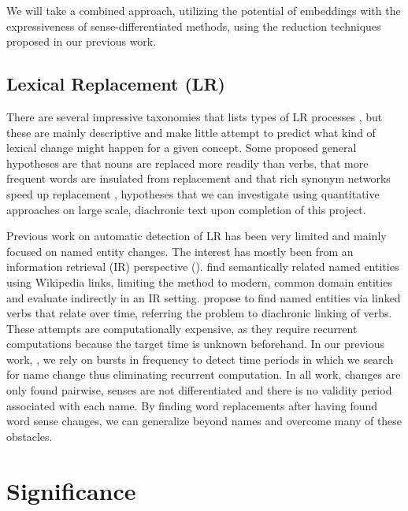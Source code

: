 \documentclass[12pt,twoside,a4paper]{article}
\begin{document}
	 


	We will take a combined approach, utilizing the potential of embeddings with the expressiveness of sense-differentiated methods, using the reduction techniques proposed in our previous work.  

	
	
	\subsection{Lexical Replacement (LR)}

There are several impressive taxonomies that lists types of LR processes \citep{ullman_principles_1957}, but these are mainly descriptive and make little attempt to predict what kind of lexical change might happen for a given concept. Some proposed general hypotheses are that nouns are replaced more readily than verbs, that more frequent words are insulated from replacement \citep{pagel-etal-2007} and that rich synonym networks speed up replacement \citep{vejdemo_semantic_2016}, hypotheses that we can investigate using quantitative approaches on large scale, diachronic text upon completion of this project. 

Previous work on automatic detection of LR has been very limited and mainly focused on named entity changes. The interest has mostly been from an information retrieval (IR) perspective (\cite{Anand,Time-MachineSearch, BerberichBSW09,morsy2016accounting}). 
	\cite{KanhabuaN10} find semantically related named entities using Wikipedia links, limiting the method to modern, common domain entities and evaluate indirectly in an IR setting.   \cite{SITAC} propose to find named entities via linked verbs that relate over time, referring the problem to diachronic linking of verbs. %
  These attempts are computationally expensive, as they require recurrent computations because the target time is unknown beforehand. In our previous work, \cite{ourColingPaper}, we rely on bursts in frequency to detect time periods in which we search for name change thus eliminating recurrent computation.  In all work, changes are only found pairwise, senses are not differentiated and there is no validity period associated with each name. By finding word replacements after having found word sense changes, we can generalize beyond names and overcome many of these obstacles. 
  
	\section{Significance}
	
\end{document}
